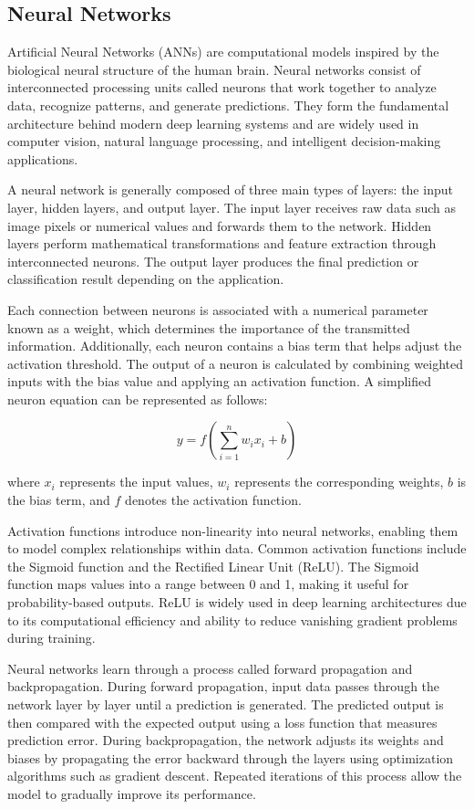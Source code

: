 \subsection{Neural Networks}

Artificial Neural Networks (ANNs) are computational models inspired by the biological neural structure of the human brain. Neural networks consist of interconnected processing units called neurons that work together to analyze data, recognize patterns, and generate predictions. They form the fundamental architecture behind modern deep learning systems and are widely used in computer vision, natural language processing, and intelligent decision-making applications.

A neural network is generally composed of three main types of layers: the input layer, hidden layers, and output layer. The input layer receives raw data such as image pixels or numerical values and forwards them to the network. Hidden layers perform mathematical transformations and feature extraction through interconnected neurons. The output layer produces the final prediction or classification result depending on the application.

Each connection between neurons is associated with a numerical parameter known as a weight, which determines the importance of the transmitted information. Additionally, each neuron contains a bias term that helps adjust the activation threshold. The output of a neuron is calculated by combining weighted inputs with the bias value and applying an activation function. A simplified neuron equation can be represented as follows:

\[
y = f\left(\sum_{i=1}^{n} w_i x_i + b\right)
\]

where \(x_i\) represents the input values, \(w_i\) represents the corresponding weights, \(b\) is the bias term, and \(f\) denotes the activation function.

Activation functions introduce non-linearity into neural networks, enabling them to model complex relationships within data. Common activation functions include the Sigmoid function and the Rectified Linear Unit (ReLU). The Sigmoid function maps values into a range between 0 and 1, making it useful for probability-based outputs. ReLU is widely used in deep learning architectures due to its computational efficiency and ability to reduce vanishing gradient problems during training.

Neural networks learn through a process called forward propagation and backpropagation. During forward propagation, input data passes through the network layer by layer until a prediction is generated. The predicted output is then compared with the expected output using a loss function that measures prediction error. During backpropagation, the network adjusts its weights and biases by propagating the error backward through the layers using optimization algorithms such as gradient descent. Repeated iterations of this process allow the model to gradually improve its performance.

